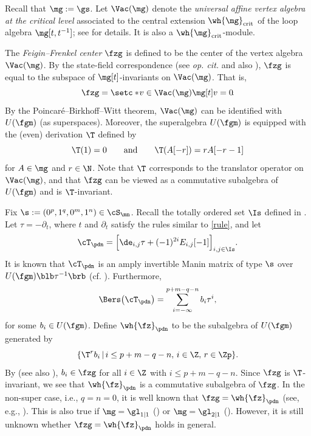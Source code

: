 \documentclass[11pt, reqno]{amsart}
\theoremstyle{definition}
\theoremstyle{remark}
\numberwithin{equation}{section}
\begin{document}
Recall that $\mg:=\gs$.
Let $\Vac(\mg)$ denote the \emph{universal affine vertex algebra at the critical level} associated to the central extension $\wh{\mg}_{\rm crit}$ of the loop algebra $\mg[t,t^{-1}]$; see \cite{Fr07, FBZ, MR} for details. It is also a $\wh{\mg}_{\rm crit}$-module.

The \emph{Feigin--Frenkel center} $\fzg$ is defined to be the center of the vertex algebra $\Vac(\mg)$.
By the state-field correspondence (see \emph{op. cit.} and also \cite[Section 3.1]{ChL25}), $\fzg$ is equal to the subspace of $\mg[t]$-invariants on $\Vac(\mg)$.
That is,
$$
\fzg=\setc*{\! v \in \Vac(\mg)}{\mg[t] v=0 \!}.
$$
By the Poincar\'e--Birkhoff--Witt theorem, $\Vac(\mg)$ can be identified with $U(\fgm)$ (as superspaces).
Moreover, the superalgebra $U(\fgm)$ is equipped with the (even) derivation $\T$ defined by
$$
\T(1)=0 \qquad \text{and}\qquad \T(A[-r])=r A[-r-1]
$$
for $A \in \mg$ and $r \in \N$.
Note that $\T$ corresponds to the translator operator on $\Vac(\mg)$, and that $\fzg$ can be viewed as a commutative subalgebra of $U(\fgm)$ and is $\T$-invariant.

Fix $\s:=(0^p, 1^q, 0^m, 1^n) \in \cS_\mn$.
Recall the totally ordered set $\Is$ defined in .
Let $\tau=-\partial_t$, where $t$ and $\partial_t$ satisfy the rules similar to \eqref{rule},
and let
$$
\cT_\pdn=\Big[\de_{i,j}\tau+(-1)^{2i}E_{i,j}[-1]\Big]_{i,j \in \Is}.
$$
It is known that $\cT_\pdn$ is an amply invertible Manin matrix of type $\s$ over $U(\fgm) \blb \tau^{-1} \brb$ (cf. \cite[Lemma 3.1]{MR}).
Furthermore,
\begin{equation} \label{Bers-T}
\Bers  \! \left(\cT_\pdn \right)=\sum_{i=-\infty}^{p+m-q-n}b_i \tau^i,
\end{equation}
for some $b_i \in U(\fgm)$.
%
Define $\wh{\fz}_\pdn$ to be the subalgebra of $U(\fgm)$ generated by
$$
\{\T^r b_i \, | \, i \le p+m-q-n, \, i \in \Z, \, r \in \Zp \}.
$$
By \cite[Corollary 3.3]{MR} (see also \cite[Proposition 3.3]{ChL25}),
$
b_i \in \fzg
$
for all $i \in \Z$ with $i \leq p+m-q-n$.
Since $\fzg$ is $\T$-invariant, we see that $\wh{\fz}_\pdn$ is a commutative subalgebra of $\fzg$.
In the non-super case, i.e., $q=n=0$, it is well known that $\fzg=\wh{\fz}_\pdn$ (see, e.g., \cite{FF, CM, Mo18}).
This is also true if $\mg=\gl_{1|1}$ (\cite{MM15}) or $\mg=\gl_{2|1}$ (\cite{AN}).
However, it is still unknown whether $\fzg=\wh{\fz}_\pdn$ holds in general.
\end{document}
